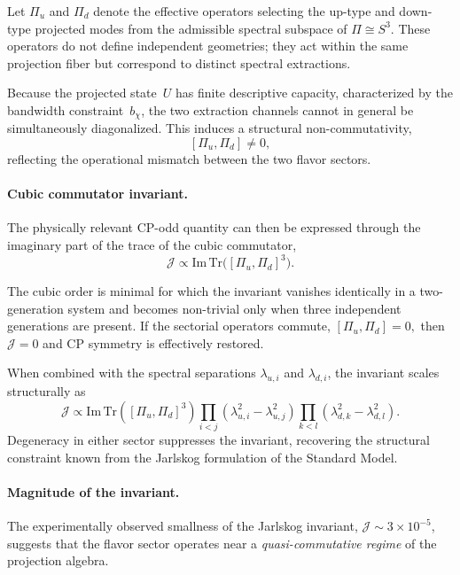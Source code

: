    Let $\Pi_u$ and $\Pi_d$ denote the effective operators selecting the
    up-type and down-type projected modes from the admissible spectral
    subspace of $\Pi \cong S^3$.
    These operators do not define independent geometries;
    they act within the same projection fiber but correspond to distinct
    spectral extractions.

    Because the projected state~$U$ has finite descriptive capacity,
    characterized by the bandwidth constraint~$b_\chi$,
    the two extraction channels cannot in general be simultaneously
    diagonalized.
    This induces a structural non-commutativity,
    \[
      [\Pi_u,\Pi_d] \neq 0 ,
    \]
    reflecting the operational mismatch between the two flavor sectors.

  \paragraph{Cubic commutator invariant.}

    The physically relevant CP-odd quantity can then be expressed through
    the imaginary part of the trace of the cubic commutator,
    \begin{equation}
      \mathcal{J}
      \propto
      \mathrm{Im}\,\mathrm{Tr}\bigl([\Pi_u,\Pi_d]^3\bigr).
    \end{equation}

    The cubic order is minimal for which the invariant vanishes
    identically in a two-generation system and becomes non-trivial only
    when three independent generations are present.
    If the sectorial operators commute,
    \(
    [\Pi_u,\Pi_d]=0 ,
    \)
    then $\mathcal{J}=0$ and CP symmetry is effectively restored.

    When combined with the spectral separations
    $\lambda_{u,i}$ and $\lambda_{d,i}$,
    the invariant scales structurally as
    \[
      \mathcal{J}
      \propto
      \mathrm{Im}\,\mathrm{Tr}([\Pi_u,\Pi_d]^3)
      \prod_{i<j}(\lambda_{u,i}^2-\lambda_{u,j}^2)
      \prod_{k<l}(\lambda_{d,k}^2-\lambda_{d,l}^2).
    \]
    Degeneracy in either sector suppresses the invariant,
    recovering the structural constraint known from the Jarlskog
    formulation of the Standard Model.

  \paragraph{Magnitude of the invariant.}

    The experimentally observed smallness of the Jarlskog invariant,
    $\mathcal{J}\sim3\times10^{-5}$,
    suggests that the flavor sector operates near a
    \emph{quasi-commutative regime} of the projection algebra.

